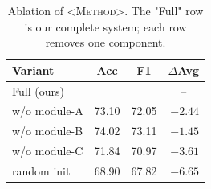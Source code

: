 \begin{table}[t]
  \centering
  \caption{Ablation of \textsc{<Method>}. The "Full" row is our complete system;
           each row removes one component.}
  \label{tab:ablation}
  \begin{tabular}{l S[table-format=2.2] S[table-format=2.2] r}
    \toprule
    Variant & {Acc} & {F1} & {$\Delta$Avg} \\
    \midrule
    Full (ours)        &  &  &  \\
    \quad w/o module-A & 73.10 & 72.05 & $-2.44$ \\
    \quad w/o module-B & 74.02 & 73.11 & $-1.45$ \\
    \quad w/o module-C & 71.84 & 70.97 & $-3.61$ \\
    \quad random init  & 68.90 & 67.82 & $-6.65$ \\
    \bottomrule
  \end{tabular}
\end{table}
